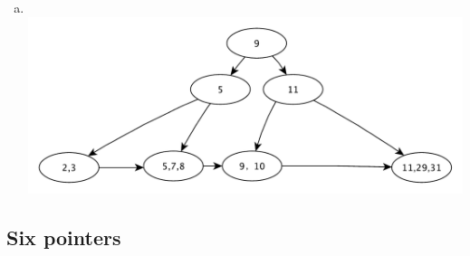 \documentclass[a4paper,11pt]{article}
\begin{document}
\begin{enumerate}[a.]
    \item ~\\
        \includegraphics[scale=0.7]{2-1-5}
\end{enumerate}

\subsection*{Six pointers}
\end{document}
